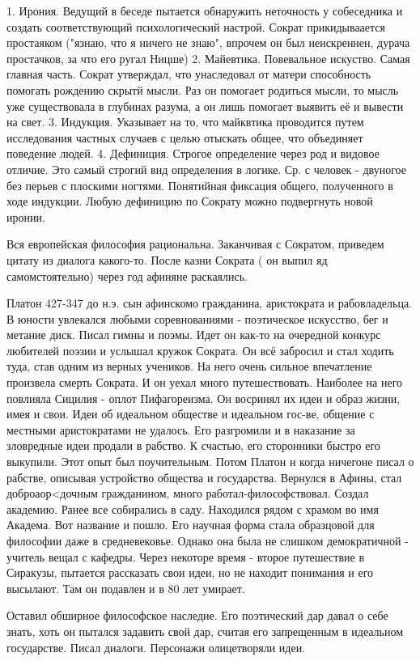 	1. Ирония. Ведущий в беседе пытается обнаружить неточность у собеседника и создать соответствующий психологический настрой. Сократ прикидываается простаяком ("язнаю, что я ничего не знаю", впрочем он был неискреннен, дурача простачков, за что его ругал Ницше)
	2. Майевтика. Повевальное искуство. Самая главная часть. Сократ утверждал, что унаследовал от матери способность помогать рождению скрытй мысли. Раз он помогает родиться мысли, то мысль уже существовала в глубинах разума, а он лишь помогает выявить её и вывести на свет.
	3. Индукция. Указывает на то, что майквтика проводится путем исследования частных случаев с целью отыскать общее, что объединяет поведение людей.
	4. Дефиниция. Строгое определение через род и видовое отличие. Это самый строгий вид определения в логике. Ср. с человек - двуногое без перьев с плоскими ногтями. Понятийная фиксация общего, полученного в ходе индукции. Любую дефиницию по Сократу можно подвергнуть новой иронии.

Вся европейская философия рациональна.
Заканчивая с Сократом, приведем цитату из диалога какого-то.
После казни Сократа ( он выпил яд самомстоятельно) через год афиняне раскаялись.

Платон
427-347 до н.э.  сын афинскомо гражданина, аристократа и рабовладельца. В юности увлекался любыми соревнованиями - поэтическое искусство, бег и метание диск. Писал гимны и поэмы. Идет он как-то на очередной конкурс любителей поэзии и услышал кружок Сократа. Он всё забросил и стал ходить туда, став одним из верных учеников. На него очень сильное впечатление произвела смерть Сократа. И он уехал много путешествовать. Наиболее на него повлияла Сицилия - оплот Пифагореизма. Он восринял их идеи и образ жизни, имея и свои. Идеи об идеальном обществе и идеальном гос-ве, общение с местными аристократами не удалось. Его разгромили и в наказание за зловредные идеи продали в рабство. К счастью, его сторонники быстро его выкупили. Этот опыт был поучительным. Потом Платон н когда ничегоне писал о рабстве, описывая устройство общества и государства. Вернулся в Афины, стал доброаор<дочным гражданином, много работал-философствовал. Создал академию. Ранее все собирались в саду. Находился рядом с храмом во имя Академа. Вот название и пошло. Его научная форма стала образцовой для философии даже в средневековье. Однако она была не слишком демократичной - учитель вещал с кафедры. Через некоторе время - второе путешествие в Сиракузы, пытается рассказать свои идеи, но не находит понимания и его высылают. Там он подавлен и в 80 лет умирает.

Оставил обширное философское наследие. Его поэтический дар давал о себе знать, хоть он пытался задавить свой дар, считая его запрещенным в идеальном государстве. Писал диалоги. Персонажи олицетворяли идеи.
